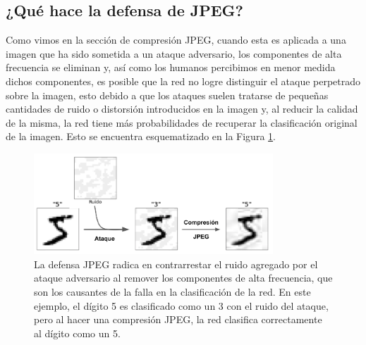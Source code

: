 \subsection{¿Qué hace la defensa de JPEG?}

Como vimos en la sección de compresión JPEG, cuando esta es aplicada a una imagen que ha sido sometida a un ataque adversario, los componentes de alta frecuencia se eliminan y, así como los humanos percibimos en menor medida dichos componentes, es posible que la red no logre distinguir el ataque perpetrado sobre la imagen, esto debido a que los ataques suelen tratarse de pequeñas cantidades de ruido o distorsión introducidos en la imagen y, al reducir la calidad de la misma, la red tiene más probabilidades de recuperar la clasificación original de la imagen. Esto se encuentra esquematizado en la Figura \ref{jpegexample}.

\begin{figure}[h!]
    \centering
    \includegraphics[width=0.8\textwidth]{images/jpeg/jpegdefense_example.png}
    \caption{La defensa JPEG radica en contrarrestar el ruido agregado por el ataque adversario al remover los componentes de alta frecuencia, que son los causantes de la falla en la clasificación de la red. En este ejemplo, el dígito 5 es clasificado como un 3 con el ruido del ataque, pero al hacer una compresión JPEG, la red clasifica correctamente al dígito como un 5.}
    \label{jpegexample}
\end{figure}

